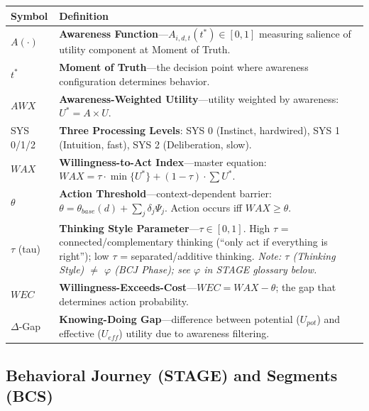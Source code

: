 \begin{longtable}{@{}p{2.8cm}p{10cm}@{}}
\toprule
\textbf{Symbol} & \textbf{Definition} \\
\midrule
\endhead
$A(\cdot)$ & \textbf{Awareness Function}---$A_{i,d,t}(t^*) \in [0,1]$ measuring salience of utility component at Moment of Truth. \\[6pt]
$t^*$ & \textbf{Moment of Truth}---the decision point where awareness configuration determines behavior. \\[6pt]
$AWX$ & \textbf{Awareness-Weighted Utility}---utility weighted by awareness: $U^* = A \times U$. \\[6pt]
SYS 0/1/2 & \textbf{Three Processing Levels}: SYS 0 (Instinct, hardwired), SYS 1 (Intuition, fast), SYS 2 (Deliberation, slow). \\[6pt]
$WAX$ & \textbf{Willingness-to-Act Index}---master equation: $WAX = \tau \cdot \min\{U^*\} + (1-\tau) \cdot \sum U^*$. \\[6pt]
$\theta$ & \textbf{Action Threshold}---context-dependent barrier: $\theta = \theta_{base}(d) + \sum_j \delta_j \Psi_j$. Action occurs iff $WAX \geq \theta$. \\[6pt]
$\tau$ (tau) & \textbf{Thinking Style Parameter}---$\tau \in [0,1]$. High $\tau$ = connected/complementary thinking (``only act if everything is right''); low $\tau$ = separated/additive thinking. \textit{Note: $\tau$ (Thinking Style) $\neq$ $\varphi$ (BCJ Phase); see $\varphi$ in STAGE glossary below.} \\[6pt]
$WEC$ & \textbf{Willingness-Exceeds-Cost}---$WEC = WAX - \theta$; the gap that determines action probability. \\[6pt]
$\Delta$-Gap & \textbf{Knowing-Doing Gap}---difference between potential ($U_{pot}$) and effective ($U_{eff}$) utility due to awareness filtering. \\
\bottomrule
\end{longtable}

\subsection{Behavioral Journey (STAGE) and Segments (BCS)}

